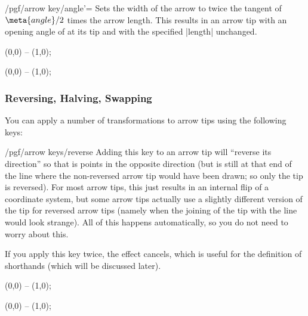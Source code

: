 \begin{key}{/pgf/arrow key/angle'=}
  Sets the width of the arrow to twice the tangent of $\meta{angle}/2$
  times the arrow length. This results in an arrow tip with an opening
  angle of  at its tip and with the specified |length|
  unchanged. 
\begin{codeexample}[]
\tikz \draw [arrows = {-Stealth[inset=0pt, length=10pt, angle'=90]}]
            (0,0) -- (1,0);
\end{codeexample}
\begin{codeexample}[]
\tikz \draw [arrows = {-Stealth[inset=0pt, length=10pt, angle'=30]}]
            (0,0) -- (1,0);
\end{codeexample}
\end{key}


\subsubsection{Reversing, Halving, Swapping}
\label{section-arrow-key-harpoon}

You can apply a number of transformations to arrow tips using the
following keys:

\begin{key}{/pgf/arrow keys/reverse}
  Adding this key to an arrow tip will ``reverse its direction'' so
  that is points in the opposite direction (but is still at that end of the
  line where the non-reversed arrow tip would have been drawn; so only
  the tip is reversed). For most arrow tips, this just results in an
  internal flip of a coordinate system, but some arrow tips actually
  use a slightly different version of the tip for reversed arrow tips
  (namely when the joining of the tip with the line would look
  strange). All of this happens automatically, so you do not need to
  worry about this.

  If you apply this key twice, the effect cancels, which is useful for
  the definition of shorthands (which will be discussed later).
\begin{codeexample}[width=3cm]
 \draw [arrows = {-Stealth[reversed]}] (0,0) -- (1,0);
\end{codeexample}
\begin{codeexample}[width=3cm]
 \draw [arrows = {-Stealth[reversed, reversed]}] (0,0) -- (1,0);
\end{codeexample}
\end{key}

